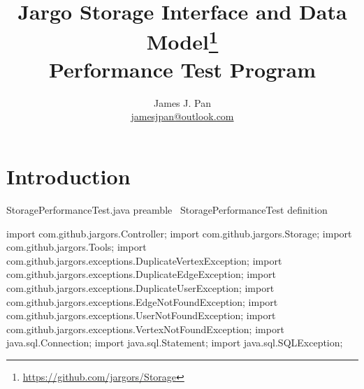 \documentclass{article}
\title{Jargo Storage Interface
  and Data Model\footnote{\url{https://github.com/jargors/Storage}}\\
  \vspace{.5em}
  \Large{\textbf{Performance Test Program}}}
\author{James J. Pan\\
  \small{\href{mailto:jamesjpan@outlook.com}{jamesjpan@outlook.com}}
}
\def\nwendcode{\endtrivlist \endgroup}
\let\nwdocspar=\par
\begin{document}
\maketitle
\pagestyle{noweb}


\tableofcontents

\section{Introduction}
\label{sec:introduction}
\endmoddef{}
\LA{}StoragePerformanceTest.java preamble~{\nwtagstyle{}}\RA{}
\LA{}\code{}StoragePerformanceTest\edoc{} definition~{\nwtagstyle{}}\RA{}
\nwendcode{}\nwdocspar

\nwenddocs{}\endmoddef{}
import com.github.jargors.Controller;
import com.github.jargors.Storage;
import com.github.jargors.Tools;
import com.github.jargors.exceptions.DuplicateVertexException;
import com.github.jargors.exceptions.DuplicateEdgeException;
import com.github.jargors.exceptions.DuplicateUserException;
import com.github.jargors.exceptions.EdgeNotFoundException;
import com.github.jargors.exceptions.UserNotFoundException;
import com.github.jargors.exceptions.VertexNotFoundException;
import java.sql.Connection;
import java.sql.Statement;
import java.sql.SQLException;
\nwendcode{}\nwdocspar
\end{document}
